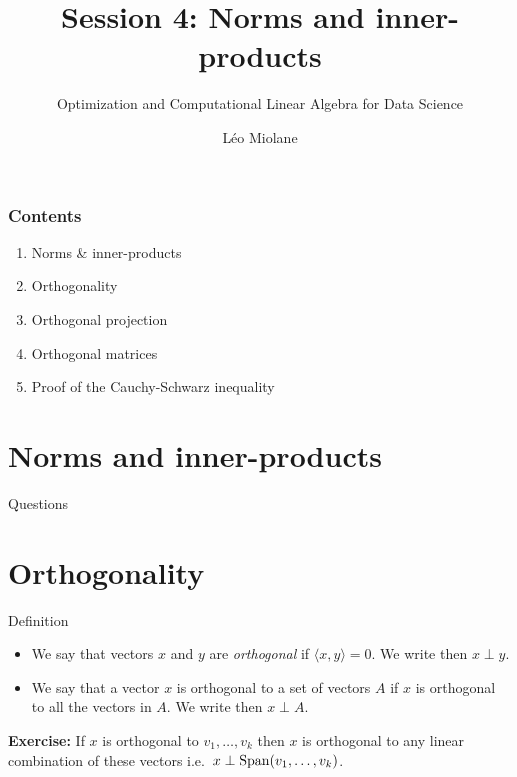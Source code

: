 \documentclass{beamer}
\title{Session 4: Norms and inner-products}
\subtitle{Optimization and Computational Linear Algebra for Data Science}
\author{Léo Miolane}
\date{}
\begin{document}
\setcounter{showProgressBar}{0}
\setcounter{showSlideNumbers}{0}

\frame{\titlepage}

\begin{frame}
	\frametitle{Contents}
	\begin{enumerate}
		\item Norms \& inner-products
		\item Orthogonality
		\item Orthogonal projection
		\item Orthogonal matrices
		\item Proof of the Cauchy-Schwarz inequality
	\end{enumerate}
\end{frame}


\setcounter{framenumber}{0}
\setcounter{showSlideNumbers}{1}
\section{Norms and inner-products}
\begin{frame}[t]{Questions}
	\grid 

	\pause
	\pause
\end{frame}

\section{Orthogonality}

\begin{frame}[t]{Definition}
	\grid 

	\vspace{-0.4cm}
	\begin{definition}
		\begin{itemize}
			\item We say that vectors $x$ and $y$ are \emph{orthogonal} if $\langle x,y \rangle = 0$. We write then $x \perp y$.
			\item We say that a vector $x$ is orthogonal to a set of vectors $A$ if $x$ is orthogonal to all the vectors in $A$. We write then $x \perp A$.
		\end{itemize}
	\end{definition}


	\textbf{Exercise:}
		If $x$ is orthogonal to $v_1, \dots, v_k$ then $x$ is orthogonal to any linear combination of these vectors i.e.\ $x \perp {{\rm Span}}(v_1, \dots, v_k)$.
\end{frame}
\end{document}
